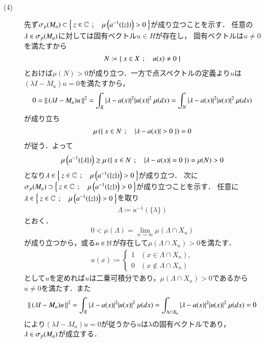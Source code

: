 \begin{prf}
\begin{description}
			\item[(4)] 
				先ず$\mathfrak{\sigma}_p (M_a) \subset \left\{\ z \in \mathbb{C}\ \, ; \quad \mu\left( a^{-1}(\{z\}) \right) > 0\ \right\}$が成り立つことを示す．
				任意の$\lambda \in \mathfrak{\sigma}_p (M_a)$に対しては固有ベクトル$u \in H$が存在し，
				固有ベクトルは$u \neq 0$を満たすから
				\begin{align}
					N \coloneqq \left\{\ x \in X\ \, ; \quad u(x) \neq 0\ \right\}
				\end{align}
				とおけば$\mu(N) > 0$が成り立つ．一方で点スペクトルの定義より$u$は$(\lambda I - M_a)u = 0$を満たすから，
				\begin{align}
					0 = \left\|\, (\lambda I - M_a)u\, \right\|_{}^2 = \int_X |\lambda - a(x)|^2 |u(x)|^2\ \mu(dx)
					= \int_{N} |\lambda - a(x)|^2 |u(x)|^2\ \mu(dx)
				\end{align}
				が成り立ち
				\begin{align}
					\mu\left( \left\{\ x \in N\ \, ; \quad |\lambda - a(x)| > 0\ \right\} \right) = 0
				\end{align}
				が従う．よって
				\begin{align}
					\mu\left( a^{-1}(\{\lambda\}) \right)
					\geq \mu\left( \left\{\ x \in N\ \, ; \quad |\lambda - a(x)| = 0\ \right\} \right)
					= \mu(N)
					> 0
				\end{align}
				となり$\lambda \in \left\{\ z \in \mathbb{C}\ \, ; \quad \mu\left( a^{-1}(\{z\}) \right) > 0\ \right\}$が成り立つ．
				次に$\mathfrak{\sigma}_p (M_a) \supset \left\{\ z \in \mathbb{C}\ \, ; \quad \mu\left( a^{-1}(\{z\}) \right) > 0\ \right\}$が成り立つことを示す．
				任意に$\lambda \in \left\{\ z \in \mathbb{C}\ \, ; \quad \mu\left( a^{-1}(\{z\}) \right) > 0\ \right\}$を取り
				\begin{align}
					\Lambda \coloneqq a^{-1}(\{\lambda\})
				\end{align}
				とおく．
				\begin{align}
					0 < \mu(\Lambda) = \lim_{n \to \infty} \mu(\Lambda \cap X_n)
				\end{align}
				が成り立つから，或る$n \in \mathbb{N}$が存在して$\mu(\Lambda \cap X_n) > 0$を満たす．
				\begin{align}
					u(x) \coloneqq 
					\begin{cases}
						1 & (x \in \Lambda \cap X_n), \\
						0 & (x \notin \Lambda \cap X_n)
					\end{cases}
				\end{align}
				として$u$を定めれば$u$は二乗可積分であり，$\mu(\Lambda \cap X_n) > 0$であるから$u \neq 0$を満たす．また
				\begin{align}
					\left\|\, (\lambda I - M_a)u\, \right\|_{}^2
					= \int_X |\lambda - a(x)|^2 |u(x)|^2\ \mu(dx)
					= \int_{\Lambda \cap X_n} |\lambda - a(x)|^2 |u(x)|^2\ \mu(dx)
					= 0
				\end{align}
				により$(\lambda I - M_a)u = 0$が従うから$u$は$\lambda$の固有ベクトルであり，$\lambda \in \mathfrak{\sigma}_p (M_a)$が成立する．
				\QED
		\end{description}
	\end{prf}